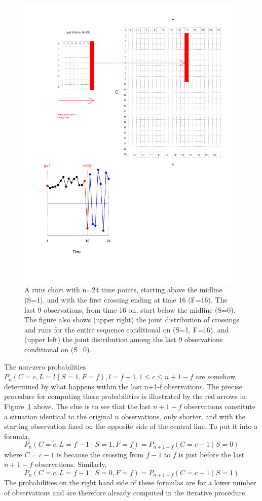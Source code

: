 \begin{figure}[htbp]
  \centering
  \caption{A runs chart with n=24 time points, starting above the 
  midline (S=1), and with the first crossing ending at time 16 (F=16). The last 9 observations, from time 16 on, start below the midline (S=0). The figure also shows (upper right) the joint distribution of crossings and runs for the entire sequence conditional on (S=1, F=16), and (upper left) the joint distribution among the last 9 observations conditional on (S=0).}
  \label{figure:rch}
  \includegraphics{run24}
\end{figure}

The non-zero probabilities $P_n (C=c,L=l \mid S=1,F=f), l=f-1, 1 \leq c \leq n+1-f$ are somehow determined by what happens within the last n+1-f observations. The precise procedure for computing these probabilities is illustrated by the red arrows in Figure~\ref{figure:rch} above. The clue is to see that the last $n+1-f$ observations constitute a situation identical to the original $n$ observations, only shorter, and with the starting observation fixed on the opposite side of the central line. To put it into a formula, $$P_n (C=c,L=f-1 \mid S=1,F=f)=P_{n+1-f} (C=c-1 \mid S=0)$$ where $C=c-1$ is because the crossing from $f-1$ to $f$ is just before the last $n+1-f$ observations. Similarly, $$P_n (C=c,L=f-1 \mid S=0,F=f)=P_{n+1-f} (C=c-1 \mid S=1)$$ The probabilities on the right hand side of these formulas are for a lower number of observations and are therefore already computed in the iterative procedure. 

